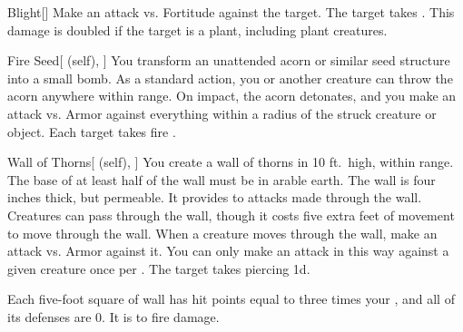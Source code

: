 \lowercase{\hypertarget{spell:Blight}{}}\label{spell:Blight}
\begin{freeability}[\nth{2}]{\hypertarget{spell:Blight}{Blight}}[]
Make an attack vs. Fortitude against the target.
\hit The target takes .
This damage is doubled if the target is a plant, including plant creatures.
\end{freeability}
\vspace{0.25em}



\lowercase{\hypertarget{spell:Fire Seed}{}}\label{spell:Fire Seed}
\begin{attuneability}[\nth{2}]{\hypertarget{spell:Fire Seed}{Fire Seed}}[ (self), ]
You transform an unattended acorn or similar seed structure into a small bomb.
As a standard action, you or another creature can throw the acorn anywhere within \rngclose range.
On impact, the acorn detonates, and you make an attack vs. Armor against everything within a \areasmall radius of the struck creature or object.
\hit Each target takes fire .
\end{attuneability}
\vspace{0.25em}



\lowercase{\hypertarget{spell:Wall of Thorns}{}}\label{spell:Wall of Thorns}
\begin{attuneability}[\nth{2}]{\hypertarget{spell:Wall of Thorns}{Wall of Thorns}}[ (self), ]
You create a wall of thorns in 10 ft.\ high, \areamed {} within \rngmed range.
The base of at least half of the wall must be in arable earth.
The wall is four inches thick, but permeable.
It provides  to attacks made through the wall.
Creatures can pass through the wall, though it costs five extra feet of movement to move through the wall.
When a creature moves through the wall, make an attack vs. Armor against it.
You can only make an attack in this way against a given creature once per .
\hit The target takes piercing  \minus1d.

Each five-foot square of wall has hit points equal to three times your , and all of its defenses are 0.
It is  to fire damage.
\end{attuneability}
\vspace{0.25em}



